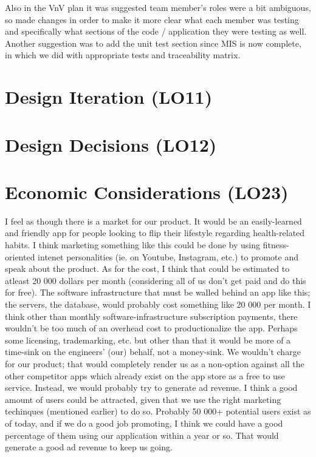 \documentclass{article}
\begin{document}
Also in the VnV plan it was suggested team member's roles were a bit ambiguous, so made changes in order to make it more clear what each member was testing and specifically what sections of the code / application they were testing as well. Another suggestion was to add the unit test section since MIS is now complete, in which we did with appropriate tests and traceability matrix.

\section{Design Iteration (LO11)}


\section{Design Decisions (LO12)}


\section{Economic Considerations (LO23)}
I feel as though there is a market for our product. It would be an easily-learned and friendly app for people looking to flip their lifestyle regarding health-related habits. I think marketing something like this could be done by using fitness-oriented intenet personalities (ie. on Youtube, Instagram, etc.) to promote and speak about the product. As for the cost, I think that could be estimated to atleast 20 000 dollars per month (considering all of us don't get paid and do this for free). The software infrastructure that must be walled behind an app like this; the servers, the database, would probably cost something like 20 000 per month. I think other than monthly software-infrastructure subscription payments, there wouldn't be too much of an overhead cost to productionalize the app. Perhaps some licensing, trademarking, etc. but other than that it would be more of a time-sink on the engineers' (our) behalf, not a money-sink.  We wouldn't charge for our product; that would completely render us as a non-option against all the other competitor apps which already exist on the app store as a free to use service. Instead, we would probably try to generate ad revenue. I think a good amount of users could be attracted, given that we use the right marketing techinques (mentioned earlier) to do so. Probably 50 000+ potential users exist as of today, and if we do a good job promoting, I think we could have a good percentage of them using our application within a year or so. That would generate a good ad revenue to keep us going.\\
\end{document}
